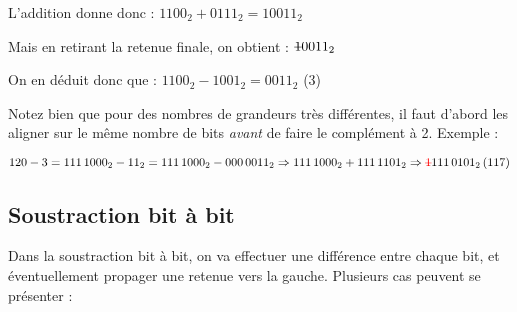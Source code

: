 \documentclass[11pt,a4paper]{article}
\begin{document}
L'addition donne donc : $ 1100_{2} + 0111_{2} = 10011_{2} $

\smallskip

Mais en retirant la retenue finale, on obtient : $ \text{\sout{1}}0011_{2} $

\medskip

On en déduit donc que : $ 1100_{2} - 1001_{2} = 0011_{2} $ (3)

\bigskip

Notez bien que pour des nombres de grandeurs très différentes, il faut d'abord les aligner sur le même nombre de bits \textit{avant} de faire le complément à 2.
Exemple :

$ 120 - 3 = 111 \, 1000_{2} - 11_{2} = 111 \, 1000_{2} - 000 \, 0011_{2} \Rightarrow 111 \, 1000_{2} + 111 \, 1101_{2} \Rightarrow \text{\textcolor{red}{\sout{1}}}111 \, 0101_{2} \, (117) $


\vfillLast

\clearpage


\subsection{Soustraction bit à bit}

Dans la soustraction bit à bit, on va effectuer une différence entre chaque bit, et éventuellement propager une retenue vers la gauche.
Plusieurs cas peuvent se présenter :

\medskip
\end{document}

